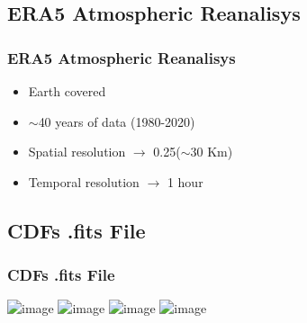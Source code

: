 \documentclass[10pt]{beamer}
\begin{document}
\subsection{ERA5 Atmospheric Reanalisys}

\begin{frame}
\frametitle{ERA5 Atmospheric Reanalisys}

\begin{itemize}
\item Earth covered \pause
\item $\sim$40 years of data (1980-2020) \pause
\item Spatial resolution $\rightarrow$ 0.25\textdegree ($\sim$30 Km) \pause
\item Temporal resolution $\rightarrow$ 1 hour \pause


\end{itemize}

\end{frame}

\subsection{CDFs .fits File}

\begin{frame}
\frametitle{CDFs .fits File}

\includegraphics<1>[height=0.75\textheight]{PWV_Monthly_CDFs/PWV_Monthly_CDFs_Hour_0}
\includegraphics<2>[height=0.75\textheight]{PWV_Monthly_CDFs/PWV_Monthly_CDFs_Hour_5}
\includegraphics<3>[height=0.75\textheight]{PWV_Monthly_CDFs/PWV_Monthly_CDFs_Hour_11}
\includegraphics<4>[height=0.75\textheight]{PWV_Monthly_CDFs/PWV_Monthly_CDFs_Hour_17}

\end{frame}
\end{document}
